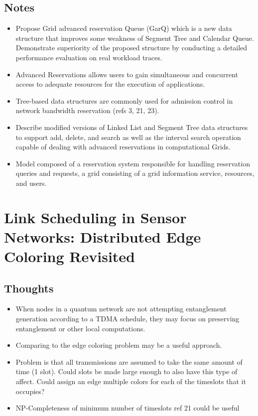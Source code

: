 \documentclass{article}
\begin{document}
\subsection{Notes}
\begin{itemize}
    \item Propose Grid advanced reservation Queue (GarQ) which is a new data structure that improves some weakness of Segment Tree and Calendar Queue.  Demonstrate superiority of the proposed structure by conducting a detailed performance evaluation on real workload traces.
    \item Advanced Reservations allows users to gain simultaneous and concurrent access to adequate resources for the execution of applications.
    \item Tree-based data structures are commonly used for admission control in network bandwidth reservation (refs 3, 21, 23).
    \item Describe modified versions of Linked List and Segment Tree data structures to support add, delete, and search as well as the interval search operation capable of dealing with advanced reservations in computational Grids.
    \item Model composed of a reservation system responsible for handling reservation queries and requests, a grid consisting of a grid information service, resources, and users.
\end{itemize}

\section{Link Scheduling in Sensor Networks: Distributed Edge Coloring Revisited}

\subsection{Thoughts}
\begin{itemize}
    \item When nodes in a quantum network are not attempting entanglement generation according to a TDMA schedule, they may focus on preserving entanglement or other local computations.
    \item Comparing to the edge coloring problem may be a useful approach.
    \item Problem is that all transmissions are assumed to take the same amount of time (1 slot).  Could slots be made large enough to also have this type of affect.  Could assign an edge multiple colors for each of the timeslots that it occupies?
    \item NP-Completeness of minimum number of timeslots ref 21 could be useful
\end{itemize}
\end{document}
